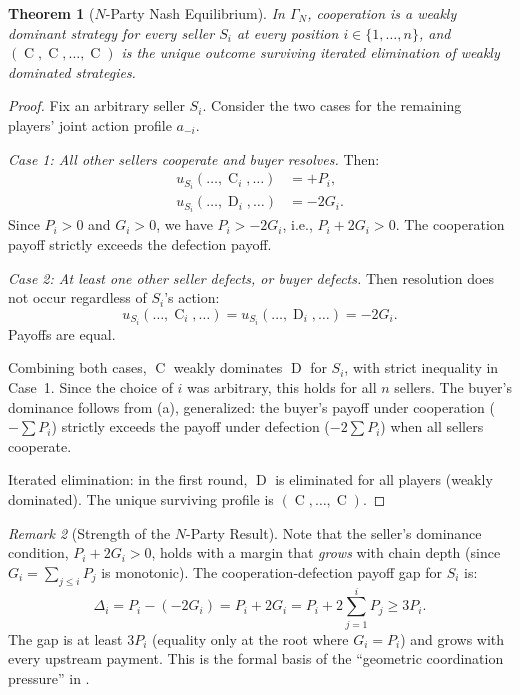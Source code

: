 \documentclass[11pt,a4paper]{article}
\newtheorem{theorem}{Theorem}[section]
\theoremstyle{definition}
\theoremstyle{remark}
\newtheorem{remark}[theorem]{Remark}
\newcommand{\pay}{P}           %
\newcommand{\cumval}{G}        %
\DeclareMathOperator{\Coop}{C}
\DeclareMathOperator{\Def}{D}
\begin{document}
\begin{theorem}[$N$-Party Nash Equilibrium]
\label{thm:n-party-nash}
In $\Gamma_N$, cooperation is a weakly dominant strategy for every
seller $S_i$ at every position $i \in \{1, \ldots, n\}$, and
$(\Coop, \Coop, \ldots, \Coop)$ is the unique outcome surviving
iterated elimination of weakly dominated strategies.
\end{theorem}

\begin{proof}
Fix an arbitrary seller $S_i$. Consider the two cases for the remaining
players' joint action profile $a_{-i}$.

\emph{Case 1: All other sellers cooperate and buyer resolves.} Then:
\begin{align}
  u_{S_i}(\ldots, \Coop_i, \ldots) &= +\pay_i, \\
  u_{S_i}(\ldots, \Def_i, \ldots) &= -2\cumval_i.
\end{align}
Since $\pay_i > 0$ and $\cumval_i > 0$, we have
$\pay_i > -2\cumval_i$, i.e., $\pay_i + 2\cumval_i > 0$. The
cooperation payoff strictly exceeds the defection payoff.

\emph{Case 2: At least one other seller defects, or buyer defects.}
Then resolution does not occur regardless of $S_i$'s action:
\begin{equation}
  u_{S_i}(\ldots, \Coop_i, \ldots) = u_{S_i}(\ldots, \Def_i, \ldots)
    = -2\cumval_i.
\end{equation}
Payoffs are equal.

Combining both cases, $\Coop$ weakly dominates $\Def$ for $S_i$, with
strict inequality in Case~1. Since the choice of $i$ was arbitrary,
this holds for all $n$ sellers. The buyer's dominance follows from
(a), generalized: the buyer's payoff under
cooperation ($-\sum \pay_i$) strictly exceeds the payoff under defection
($-2\sum \pay_i$) when all sellers cooperate.

Iterated elimination: in the first round, $\Def$ is eliminated for all
players (weakly dominated). The unique surviving profile is
$(\Coop, \ldots, \Coop)$.
\end{proof}

\begin{remark}[Strength of the $N$-Party Result]
Note that the seller's dominance condition,
$\pay_i + 2\cumval_i > 0$, holds with a margin that \emph{grows}
with chain depth (since $\cumval_i = \sum_{j \leq i} \pay_j$ is
monotonic). The cooperation-defection payoff gap for $S_i$ is:
\begin{equation}
  \Delta_i = \pay_i - (-2\cumval_i) = \pay_i + 2\cumval_i
    = \pay_i + 2\!\sum_{j=1}^{i} \pay_j \geq 3\pay_i.
\end{equation}
The gap is at least $3\pay_i$ (equality only at the root where
$\cumval_i = \pay_i$) and grows with every upstream payment. This
is the formal basis of the ``geometric coordination pressure'' in
.
\end{remark}
\end{document}
